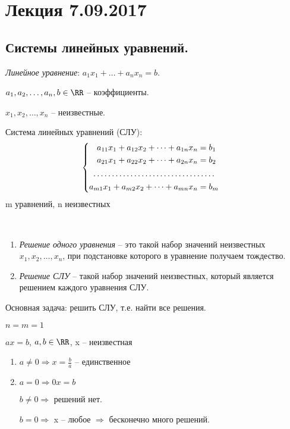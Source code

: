 \section{Лекция 7.09.2017}
\subsection{Системы линейных уравнений.}

\textit{Линейное уравнение}: $a_1 x_1 + \dots + a_n x_n = b$.

$a_1, a_2, \dots, a_n, b \in \RR$ -- коэффициенты.

$x_1, x_2, \dots, x_n$ -- неизвестные.

\bigskip
Система линейных уравнений (СЛУ):
\begin{equation*}
	\begin{cases}
        \begin{aligned}
            a_{11} x_1 + a_{12} x_2 + \cdots + a_{1n} x_n &= b_1 \\
            a_{21} x_1 + a_{22} x_2 + \cdots + a_{2n} x_n &= b_2 \\
            \hdotsfor{2} \\
            a_{m1} x_1 + a_{m2} x_2 + \cdots + a_{mn} x_n &= b_m \\
        \end{aligned}
	\end{cases}
\end{equation*}
m уравнений, n неизвестных

\begin{definition}~
    \begin{enumerate}
    \item \textit{Решение одного уравнения} -- это такой набор значений неизвестных $x_1, x_2, \dots, x_n$, при подстановке которого в уравнение получаем тождество.
    \item \textit{Решение СЛУ} -- такой набор значений неизвестных, который является решением каждого уравнения СЛУ.
    \end{enumerate}
\end{definition}

Основная задача: решить СЛУ, т.е. найти все решения.

\bigskip
\begin{example}

    $n = m = 1$

    $ax = b$, $a, b \in \RR$, x -- неизвестная

    \begin{enumerate}
    \item $a \neq 0 \Rightarrow x = \frac{b}{a}$ -- единственное

    \item $a = 0 \Rightarrow 0x = b$

        $b \neq 0 \Rightarrow$ решений нет.

        $b = 0 \Rightarrow$ x -- любое $\Rightarrow$ бесконечно много решений.
    \end{enumerate}
\end{example}

